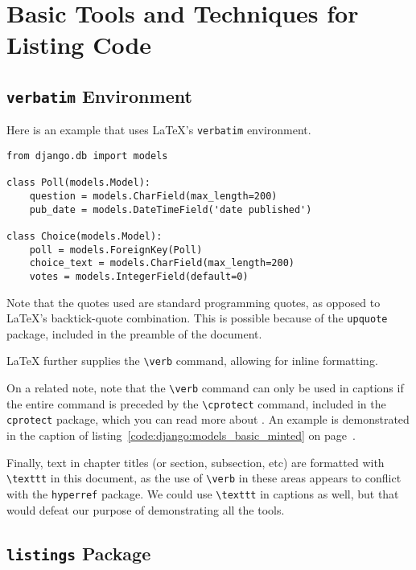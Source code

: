 \newpage

\section[Basic Techniques]{Basic Tools and Techniques for Listing Code}

\subsection{\texttt{verbatim} Environment}

Here is an example that uses \LaTeX 's \verb|verbatim| environment.

\begin{verbatim}
from django.db import models

class Poll(models.Model):
    question = models.CharField(max_length=200)
    pub_date = models.DateTimeField('date published')

class Choice(models.Model):
    poll = models.ForeignKey(Poll)
    choice_text = models.CharField(max_length=200)
    votes = models.IntegerField(default=0)
\end{verbatim}

Note that the quotes used are standard programming quotes, as opposed to \LaTeX 's backtick-quote combination. This is possible because of the \verb|upquote| package, included in the preamble of the document.

\LaTeX{} further supplies the \verb|\verb| command, allowing for inline formatting.

On a related note, note that the \verb|\verb| command can only be used in captions if the entire command is preceded by the \verb|\cprotect| command, included in the \verb|cprotect| package, which you can read more about . An example is demonstrated in the caption of listing~\ref{code:django:models_basic_minted} on page~\pageref{code:django:models_basic_minted}.

Finally, text in chapter titles (or section, subsection, etc) are formatted with \verb|\texttt| in this document, as the use of \verb|\verb| in these areas appears to conflict with the \verb|hyperref| package. We could use \verb|\texttt| in captions as well, but that would defeat our purpose of demonstrating all the tools.

\subsection{\texttt{listings} Package}

